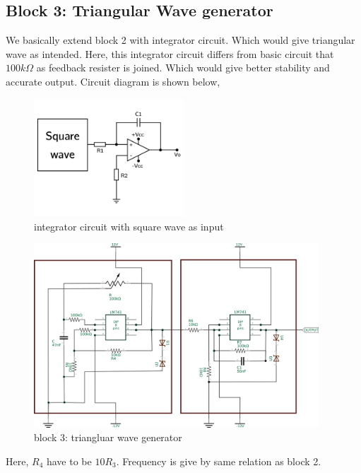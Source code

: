 \documentclass[14pt,a4paper]{extarticle}
\begin{document}
\subsection{Block 3: Triangular Wave generator}
\label{sec:org5b04e51}

We basically extend block 2 with integrator circuit. Which would give triangular wave as intended. Here, this integrator circuit differs from basic circuit that \(100k\Omega\) as feedback resister is joined. Which would give better stability and accurate output. Circuit diagram is shown below,


\begin{figure}[H]
    \centering
    \includegraphics[width=0.5\textwidth]{imgs/triang.png}
    \caption{integrator circuit with square wave as input}
    \label{fig:triang}
\end{figure}

\begin{figure}[H]
    \centering
    \includegraphics[width=0.95\textwidth]{imgs/triangreal.png}
    \caption{block 3: triangluar wave generator}
    \label{fig:tringularreal}
\end{figure}

Here, \(R_{4}\) have to be \(10R_{3}\). Frequency is give by same relation as block 2.
\end{document}

